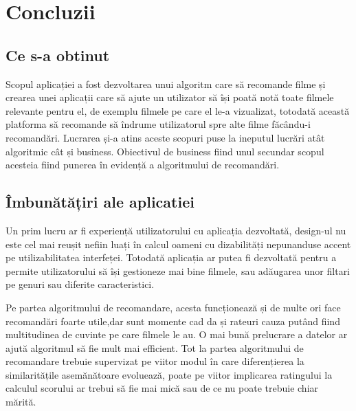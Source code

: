 \chapter{Concluzii}
\section{Ce s-a obtinut}

\par Scopul aplicației a fost dezvoltarea unui algoritm care să recomande filme și crearea unei aplicații care să ajute un utilizator să își poată notă toate filmele relevante pentru el, de exemplu filmele pe care el le-a vizualizat, totodată această platforma să recomande să îndrume utilizatorul spre alte filme făcându-i recomandări. Lucrarea și-a atins aceste scopuri puse la ineputul lucrări atât algoritmic cât și business. Obiectivul de business fiind unul secundar scopul acesteia fiind punerea în evidență a algoritmului de recomandări.

\section{Îmbunătățiri ale aplicatiei}
\par Un prim lucru ar fi experiență utilizatorului cu aplicația dezvoltată, design-ul nu este cel mai reușit nefiin luați în calcul oameni cu dizabilități nepunanduse accent pe utilizabilitatea interfeței. Totodată aplicația ar putea fi dezvoltată pentru a permite utilizatorului să își gestioneze mai bine filmele, sau adăugarea unor filtari pe genuri sau diferite caracteristici.
\par Pe partea algoritmului de recomandare, acesta funcționează și de multe ori face recomandări foarte utile,dar sunt momente cad da și rateuri cauza putând fiind multitudinea de cuvinte pe care filmele le au. O mai bună prelucrare a datelor ar ajută algoritmul să fie mult mai efficient. Tot la partea algoritmului de recomandare trebuie supervizat pe viitor modul în care diferențierea la similaritățile asemănătoare evoluează, poate pe viitor implicarea ratingului la calculul scorului ar trebui să fie mai mică sau de ce nu poate trebuie chiar mărită.